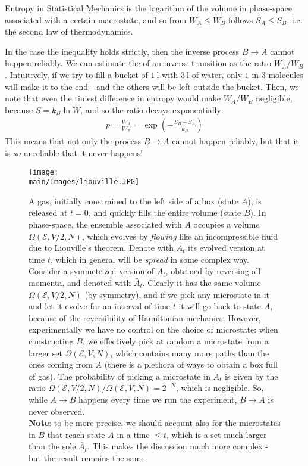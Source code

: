 \documentclass[../../main.tex]{subfiles}
\begin{document}
\medskip

Entropy in Statistical Mechanics is the logarithm of the volume in phase-space associated with a certain macrostate, and so from $W_A \leq W_B$ follows $S_A \leq S_B$, i.e. the second law of thermodynamics.

\medskip

In the case the inequality holds strictly, then the inverse process $B \to A$ cannot happen reliably. We can estimate the  of an inverse transition as the ratio $W_A/W_B$. Intuitively, if we try to fill a bucket of $\SI{1}{\l}$ with $\SI{3}{\l}$ of water, only $1$ in $3$ molecules will make it to the end - and the others will be left outside the bucket. Then, we note that even the tiniest difference in entropy would make $W_A/W_B$ negligible, because $S = k_B \ln W$, and so the ratio decays exponentially:
\begin{align*}
    p = \frac{W_A}{W_B} = \exp\left(-\frac{S_B - S_A}{k_B} \right) 
\end{align*}
This means that not only the process $B \to A$ cannot happen reliably, but that it is \textit{so} unreliable that it never happens!

\begin{figure}[H]
    \centering
    \texttt{[image: \\main/Images/liouville.JPG]}
    \caption{A gas, initially constrained to the left side of a box (state $A$), is released at $t=0$, and quickly fills the entire volume (state $B$). In phase-space, the ensemble associated with $A$ occupies a volume $\Omega(\mathcal{E}, V/2, N)$, which evolves by \textit{flowing} like an incompressible fluid due to Liouville's theorem. Denote with $A_t$ its evolved version at time $t$, which in general will be \textit{spread} in some complex way. Consider a symmetrized version of $A_t$, obtained by reversing all momenta, and denoted with $\bar{A}_t$. Clearly it has the same volume $\Omega(\mathcal{E}, V/2, N)$ (by symmetry), and if we pick any microstate in it and let it evolve for an interval of time $t$ it will go back to state $A$, because of the reversibility of Hamiltonian mechanics. However, experimentally we have no control on the choice of microstate: when constructing $B$, we effectively pick at random a microstate from a larger set $\Omega(\mathcal{E}, V, N)$, which contains many more paths than the ones coming from $A$ (there is a plethora of ways to obtain a box full of gas). The probability of picking a microstate in $\bar{A}_t$ is given by the ratio $\Omega(\mathcal{E}, V/2, N)/\Omega(\mathcal{E}, V, N) = 2^{-N}$, which is negligible. So, while $A \to B$ happens every time we run the experiment, $B \to A$ is never observed.\\\hspace{\textwidth}
    \textbf{Note}: to be more precise, we should account also for the microstates in $B$ that reach state $A$ in a time $\leq t$, which is a set much larger than the sole $\bar{A}_t$. This makes the discussion much more complex - but the result remains the same.}
    \label{fig:liouville-irreversibility}
\end{figure}
\end{document}
